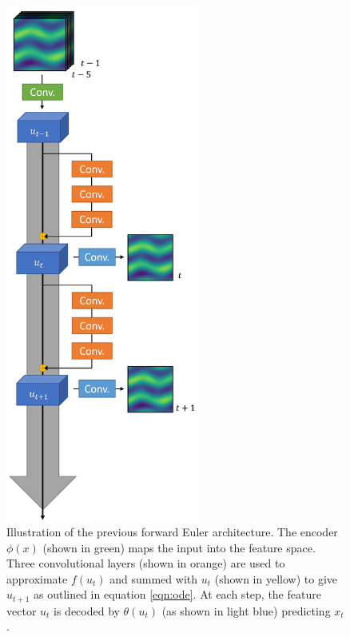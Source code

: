 \documentclass[12pt]{article}
\theoremstyle{plain}
\theoremstyle{remark}
\theoremstyle{definition}
\begin{document}
\begin{figure}
	\begin{minipage}[c]{0.49\textwidth}
		\centering
		\includegraphics[width=2.5in]{pde_arch}
		\caption{Illustration of the previous forward Euler architecture. The encoder $\phi(x)$ (shown in green) maps the input into the feature space. Three convolutional layers (shown in orange) are used to approximate $f(u_t)$ and summed with $u_t$ (shown in yellow) to give $u_{t+1}$ as outlined in equation \ref{eqn:ode}. At each step, the feature vector $u_t$ is decoded by $\theta(u_t)$ (as shown in light blue) predicting $x_t$.}
		\label{fig:arch}


\end{minipage}
\end{figure}
\end{document}
